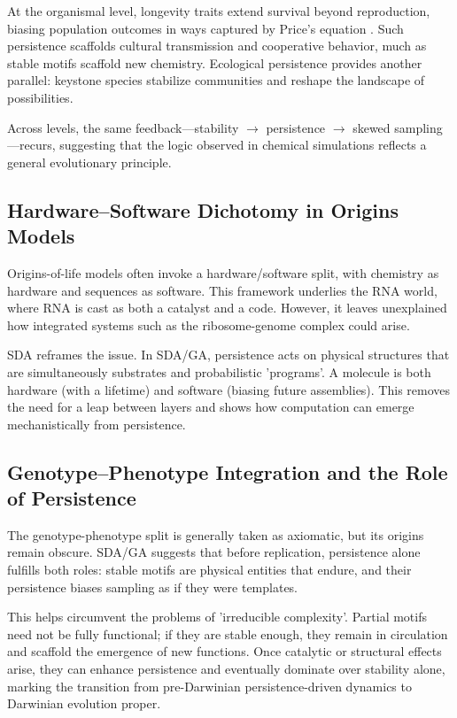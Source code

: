 \documentclass[life,article,submit,pdftex,moreauthors]{Definitions/mdpi}
\begin{document}
At the organismal level, longevity traits extend survival beyond reproduction, biasing population outcomes in ways captured by Price’s equation \cite{price1970}. 
Such persistence scaffolds cultural transmission and cooperative behavior, much as stable motifs scaffold new chemistry. 
Ecological persistence provides another parallel: keystone species stabilize communities and reshape the landscape of possibilities.  

Across levels, the same feedback—stability $\to$ persistence $\to$ skewed sampling—recurs, suggesting that the logic observed in chemical simulations reflects a general evolutionary principle.  

\subsection{Hardware–Software Dichotomy in Origins Models}
Origins-of-life models often invoke a hardware/software split, with chemistry as hardware and sequences as software. 
This framework underlies the RNA world, where RNA is cast as both a catalyst and a code. 
However, it leaves unexplained how integrated systems such as the ribosome-genome complex could arise.  

SDA reframes the issue. In SDA/GA, persistence acts on physical structures that are simultaneously substrates and probabilistic 'programs'. 
A molecule is both hardware (with a lifetime) and software (biasing future assemblies). 
This removes the need for a leap between layers and shows how computation can emerge mechanistically from persistence.  

\subsection{Genotype–Phenotype Integration and the Role of Persistence}
The genotype-phenotype split is generally taken as axiomatic, but its origins remain obscure. 
SDA/GA suggests that before replication, persistence alone fulfills both roles: stable motifs are physical entities that endure, and their persistence biases sampling as if they were templates.  

This helps circumvent the problems of 'irreducible complexity'. 
Partial motifs need not be fully functional; if they are stable enough, they remain in circulation and scaffold the emergence of new functions. 
Once catalytic or structural effects arise, they can enhance persistence and eventually dominate over stability alone, marking the transition from pre-Darwinian persistence-driven dynamics to Darwinian evolution proper.  
\end{document}
